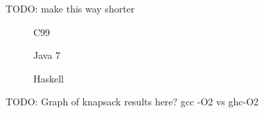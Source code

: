 \documentclass[smallextended]{svjour3}       %
\begin{document}
TODO: make this way shorter

\begin{figure}
\label{fig:gcds:c}

\caption{C99}
\end{figure}
\begin{figure}
\label{fig:gcds:java}

\caption{Java 7}
\end{figure}
\begin{figure}
\label{fig:gcds:haskell}

\caption{Haskell}
\end{figure}



TODO: Graph of knapsack results here? gcc -O2 vs ghc-O2
\end{document}
